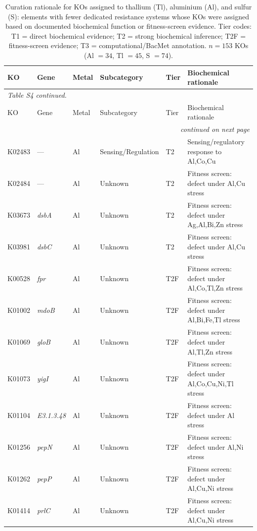 \documentclass[11pt]{article}
\begin{document}
\begin{longtable}{lllllp{4.8cm}}
\caption{Curation rationale for KOs assigned to thallium (Tl), aluminium (Al),
and sulfur (S): elements with fewer dedicated resistance systems whose KOs were
assigned based on documented biochemical function or fitness-screen evidence.
Tier codes: T1 = direct biochemical evidence; T2 = strong biochemical inference;
T2F = fitness-screen evidence; T3 = computational/BacMet annotation.
$n = 153$ KOs (Al $= 34$, Tl $= 45$, S $= 74$).}
\label{tab:tl_al_s}\\
\toprule
KO & Gene & Metal & Subcategory & Tier & Biochemical rationale \\
\midrule
\endfirsthead
\multicolumn{6}{l}{\small\textit{Table S4 continued.}}\\
\toprule
KO & Gene & Metal & Subcategory & Tier & Biochemical rationale \\
\midrule
\endhead
\midrule
\multicolumn{6}{r}{\small\textit{continued on next page}}\\
\endfoot
\bottomrule
\endlastfoot
K02483 & --- & Al & Sensing/Regulation & T2 & Sensing/regulatory response to Al,Co,Cu \\
K02484 & --- & Al & Unknown & T2 & Fitness screen: defect under Al,Cu stress \\
K03673 & \textit{dsbA} & Al & Unknown & T2 & Fitness screen: defect under Ag,Al,Bi,Zn stress \\
K03981 & \textit{dsbC} & Al & Unknown & T2 & Fitness screen: defect under Al,Cu stress \\
K00528 & \textit{fpr} & Al & Unknown & T2F & Fitness screen: defect under Al,Co,Tl,Zn stress \\
K01002 & \textit{mdoB} & Al & Unknown & T2F & Fitness screen: defect under Al,Bi,Fe,Tl stress \\
K01069 & \textit{gloB} & Al & Unknown & T2F & Fitness screen: defect under Al,Tl,Zn stress \\
K01073 & \textit{yigI} & Al & Unknown & T2F & Fitness screen: defect under Al,Co,Cu,Ni,Tl stress \\
K01104 & \textit{E3.1.3.48} & Al & Unknown & T2F & Fitness screen: defect under Al stress \\
K01256 & \textit{pepN} & Al & Unknown & T2F & Fitness screen: defect under Al,Ni stress \\
K01262 & \textit{pepP} & Al & Unknown & T2F & Fitness screen: defect under Al,Cu,Ni stress \\
K01414 & \textit{prlC} & Al & Unknown & T2F & Fitness screen: defect under Al,Cu,Ni stress \\

\end{longtable}
\end{document}
